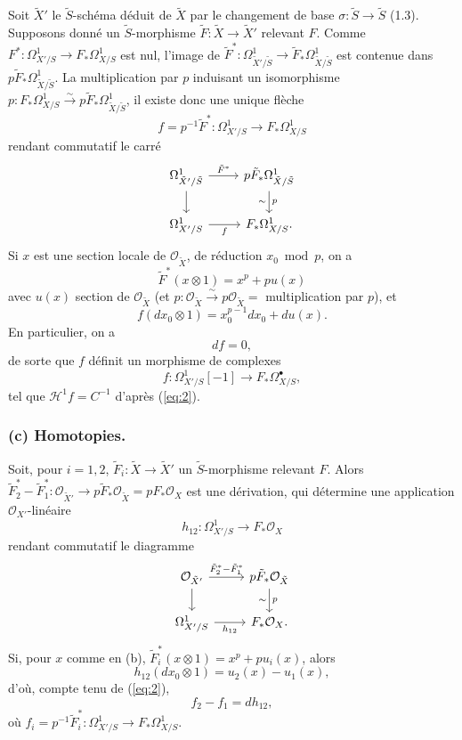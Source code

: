 \documentclass[12pt,a4paper]{article}
\theoremstyle{plain}
\theoremstyle{definition}
\theoremstyle{remark}
\newcommand{\cO}{\mathcal{O}}
\begin{document}
Soit $\tilde{X}'$ le $\tilde{S}$-sch\'ema d\'eduit de $\tilde{X}$ par le changement de base $\sigma: \tilde{S} \to \tilde{S}$ (1.3). Supposons donn\'e un $\tilde{S}$-morphisme $\tilde{F}: \tilde{X} \to \tilde{X}'$ relevant $F$. Comme $F^*: \Omega^1_{X'/S} \to F_* \Omega^1_{X/S}$ est nul, l'image de $\tilde{F}^*: \Omega^1_{\tilde{X}'/\tilde{S}} \to \tilde{F}_* \Omega^1_{\tilde{X}/\tilde{S}}$ est contenue dans $p\tilde{F}_* \Omega^1_{\tilde{X}/\tilde{S}}$. La multiplication par $p$ induisant un isomorphisme $p: F_* \Omega^1_{X/S} \xrightarrow{\sim} p\tilde{F}_* \Omega^1_{\tilde{X}/\tilde{S}}$, il existe donc une unique fl\`eche
\[
f = p^{-1}\tilde{F}^*: \Omega^1_{X'/S} \to F_* \Omega^1_{X/S}
\]
rendant commutatif le carr\'e
\[
\begin{tikzcd}
\Omega^1_{\tilde{X}'/\tilde{S}} \arrow[r, "\tilde{F}^*"] \arrow[d] & p\tilde{F}_* \Omega^1_{\tilde{X}/\tilde{S}} \arrow[d, "p", "\sim"'] \\
\Omega^1_{X'/S} \arrow[r, "f"'] & F_* \Omega^1_{X/S}.
\end{tikzcd}
\]
Si $x$ est une section locale de $\cO_{\tilde{X}}$, de r\'eduction $x_0 \bmod p$, on a
\begin{equation}\label{eq:1}
\tilde{F}^*(x \otimes 1) = x^p + p u(x)
\end{equation}
avec $u(x)$ section de $\cO_{\tilde{X}}$ (et $p: \cO_{\tilde{X}} \xrightarrow{\sim} p\cO_{\tilde{X}} =$ multiplication par $p$), et
\begin{equation}\label{eq:2}
f(dx_0 \otimes 1) = x_0^{p-1} dx_0 + du(x).
\end{equation}
En particulier, on a
\begin{equation}\label{eq:3}
df = 0,
\end{equation}
de sorte que $f$ d\'efinit un morphisme de complexes
\[
f: \Omega^1_{X'/S}[-1] \to F_* \Omega^{\bullet}_{X/S},
\]
tel que $\mathscr{H}^1 f = C^{-1}$ d'apr\`es (\ref{eq:2}).

\subsubsection*{(c) Homotopies.}

Soit, pour $i = 1, 2$, $\tilde{F}_i: \tilde{X} \to \tilde{X}'$ un $\tilde{S}$-morphisme relevant $F$. Alors $\tilde{F}_2^* - \tilde{F}_1^*: \cO_{\tilde{X}'} \to p\tilde{F}_* \cO_{\tilde{X}} = pF_* \cO_X$ est une d\'erivation, qui d\'etermine une application $\cO_{X'}$-lin\'eaire
\[
h_{12}: \Omega^1_{X'/S} \to F_* \cO_X
\]
rendant commutatif le diagramme
\[
\begin{tikzcd}
\cO_{\tilde{X}'} \arrow[r, "\tilde{F}_2^* - \tilde{F}_1^*"] \arrow[d] & p\tilde{F}_* \cO_{\tilde{X}} \arrow[d, "p", "\sim"'] \\
\Omega^1_{X'/S} \arrow[r, "h_{12}"'] & F_* \cO_X.
\end{tikzcd}
\]
Si, pour $x$ comme en (b), $\tilde{F}_i^*(x \otimes 1) = x^p + p u_i(x)$, alors
\[
h_{12}(dx_0 \otimes 1) = u_2(x) - u_1(x),
\]
d'o\`u, compte tenu de (\ref{eq:2}),
\begin{equation}\label{eq:4}
f_2 - f_1 = dh_{12},
\end{equation}
o\`u $f_i = p^{-1}\tilde{F}_i^*: \Omega^1_{X'/S} \to F_* \Omega^1_{X/S}$.
\end{document}
